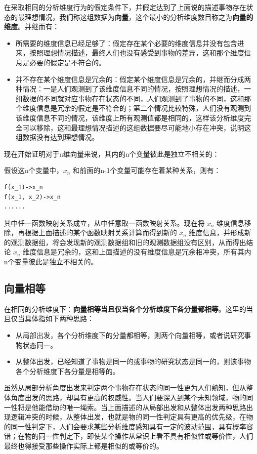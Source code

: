 \documentclass[12pt,oneside]{book}
\begin{document}
在采取相同的分析维度行为的假定条件下，并假定达到了上面说的描述事物存在状态的最理想情况，我们称这组数据为\textbf{向量}，这个最小的分析维度数目称之为\textbf{向量的维度}。并继而有：

\begin{itemize}
\item 所需要的维度信息已经足够了：假定存在某个必要的维度信息并没有包含进来，按照理想情况描述，最终人们也没有感受到事物的差异，这和那个维度信息是必要的假定是不符合的。
\item 并不存在某个维度信息是冗余的：假定某个维度信息是冗余的，并继而分成两种情况：一是人们观测到了该维度信息不同的情况，按照理想情况的描述，一组数据的不同就对应事物存在状态的不同，人们观测到了事物的不同，这和那个维度信息是冗余的假定是不符合的；第二个情况比较特殊，人们没有观测到该维度信息不同的情况，该维度上所有观测值都是相同的，这样该分析维度完全可以移除，这和最理想情况描述的这组数据要尽可能地小存在冲突，说明这组数据没有达到理想情况。
\end{itemize}

现在开始证明对于n维向量来说，其内的n个变量彼此是独立不相关的：

假设这n个变量中，$x_n$ 和前面的n-1个变量可能存在着某种关系，则有：

\begin{Verbatim}
f(x_1)->x_n
f(x_1, x_2)->x_n
......
\end{Verbatim}

其中任一函数映射关系成立，从中任意取一函数映射关系。现在将 $x_n$ 维度信息移除，再根据上面描述的某个函数映射关系计算而得到新的 $x_n$ 维度信息，并形成新的观测数据组，将会发现新的观测数据组和旧的观测数据组没有区别，从而得出结论 $x_n$ 维度信息是冗余的，这和上面描述的没有维度信息是冗余相冲突，所有其内n个变量彼此是独立不相关的。

\subsection{向量相等}
在相同的分析维度下：\textbf{向量相等当且仅当各个分析维度下各分量都相等}。这里的当且仅当具体指如下两种思路：

\begin{itemize}
\item 从局部出发，各个分析维度下的分量都相等，则两个向量相等，或者说研究事物状态同一。
\item 从整体出发，已经知道了事物是同一的或事物的研究状态是同一的，则该事物各个分析维度下各分量是相等的。
\end{itemize}

虽然从局部分析角度出发来判定两个事物存在状态的同一性更为人们熟知，但从整体角度出发的思路，却具有更高的权威性。当人们要深入到某个未知领域，物的同一性将是他能借助的唯一绳索。当上面描述的从局部出发和从整体出发两种思路出现逻辑冲突的时候，从整体出发，也就是物的同一性判定具有更高的优先级，在物的同一性判定下，人们会要求某些分析维度感知具有一定的波动范围，具有概率容错；在物的同一性判定下，即使某个操作从常识上看不具有相似性或等价性，人们最终也得接受那些操作实际上都是相似的或等价的。
\end{document}
